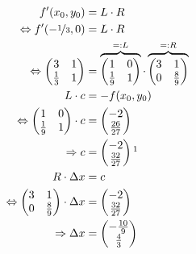 \begin{align}
%
	f'(x_0,y_0)	&= L \cdot R \\
	\Leftrightarrow f'(-\nicefrac{1}{3}, 0)	&= L \cdot R \\
	\Leftrightarrow \begin{pmatrix}
		3     & 1\\
		\frac{1}{3} & 1
	\end{pmatrix}
	&=
	\overbrace{\begin{pmatrix}
		1      & 0\\
		\frac{1}{9} & 1
	\end{pmatrix}}^{=: L} \cdot 
	\overbrace{\begin{pmatrix}
		3 & 1\\
		0      & \frac{8}{9}
	\end{pmatrix}}^{=: R}\\
%
	L \cdot c	&= -f(x_0,y_0) \\
	\Leftrightarrow
	\begin{pmatrix}
		1      & 0\\
		\frac{1}{9} & 1
	\end{pmatrix}
	\cdot c
	&=
		\begin{pmatrix}
		-2\\
		\frac{26}{27}
	\end{pmatrix}\\
	\Rightarrow
	c &=		\begin{pmatrix}
		-2\\
		\frac{32}{27}
	\end{pmatrix}\footnotemark\\
%
	R\cdot \Delta x &= c\\
	\Leftrightarrow
	\begin{pmatrix}
		3 & 1\\
		0      & \frac{8}{9}
	\end{pmatrix}
	\cdot \Delta x &=
	\begin{pmatrix}
		-2\\
		\frac{32}{27}
	\end{pmatrix}\\
	\Rightarrow \Delta x &= 
	\begin{pmatrix}
		-\frac{10}{9}\\
		\frac{4}{3}
	\end{pmatrix}
\end{align}

